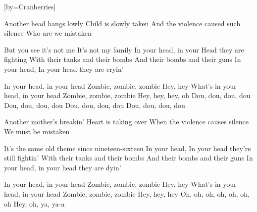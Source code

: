  

[by=Cranberries]




\beginverse
Another head hangs lowly
Child is slowly taken
And the violence caused such silence
Who are we mistaken

But you see it's not me
It's not my family
In your head, in your
Head they are fighting
With their tanks and their bombs
And their bombs and their guns
In your head,
In your head they are cryin'
\endverse

\beginchorus
In your head, in your head
Zombie, zombie, zombie
Hey, hey
What's in your head, in your head
Zombie, zombie, zombie
Hey, hey, hey, oh
Dou, dou, dou, dou
Dou, dou, dou, dou
Dou, dou, dou, dou
Dou, dou, dou, dou
\endchorus

\beginverse
Another mother's breakin'
Heart is taking over
When the violence causes silence
We must be mistaken

It's the same old theme since nineteen-sixteen
In your head,
In your head they're still fightin'
With their tanks and their bombs
And their bombs and their guns
In your head, in your head they are dyin'
\endverse

\beginchorus
In your head, in your head
Zombie, zombie, zombie
Hey, hey
What's in your head, in your head
Zombie, zombie, zombie
Hey, hey, hey
Oh, oh, oh, oh, oh, oh, oh
Hey, oh, ya, ya-a 
\endchorus


\endsong
